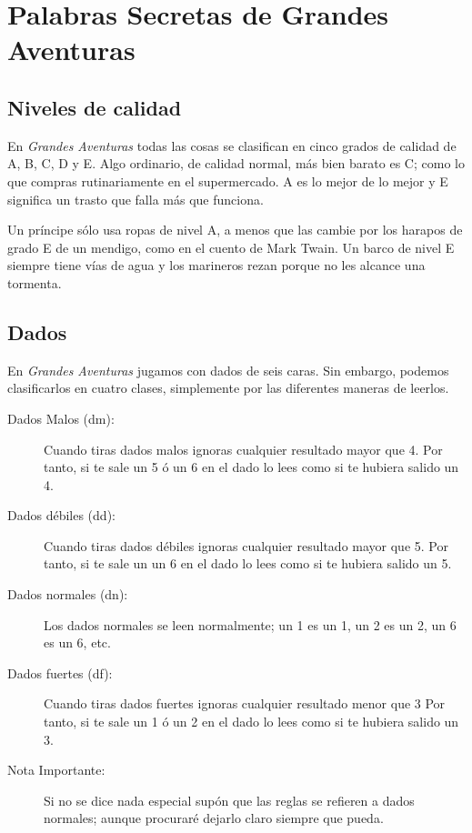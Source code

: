 \chapter{Palabras Secretas de Grandes Aventuras}

\varhrulefill

\section{Niveles de calidad}

En \emph{Grandes Aventuras} todas las cosas se clasifican en cinco grados de calidad de A, B, C, D y E. Algo ordinario, de calidad normal, más bien barato es C; como lo que compras rutinariamente en el supermercado. A es lo mejor de lo mejor y E significa un trasto que falla más que funciona.

Un príncipe sólo usa ropas de nivel A, a menos que las cambie por los harapos de grado E de un mendigo, como en el cuento de Mark Twain. Un barco de nivel E siempre tiene vías de agua y los marineros rezan porque no les alcance una tormenta. 

\section{Dados}

En \emph{Grandes Aventuras} jugamos con dados de seis caras. Sin embargo, podemos clasificarlos en cuatro clases, simplemente por las diferentes maneras de leerlos.

\begin{description}

\item[Dados Malos (dm):]
Cuando tiras dados malos ignoras cualquier resultado mayor que 4. Por tanto, si te sale un 5 ó un 6 en el dado lo lees como si te hubiera salido un 4.

\item[Dados débiles (dd):]
Cuando tiras dados débiles ignoras cualquier resultado mayor que 5. Por tanto, si te sale un un 6 en el dado lo lees como si te hubiera salido un 5.

\item[Dados normales (dn):]
Los dados normales se leen normalmente; un 1 es un 1, un 2 es un 2, un 6 es un 6, etc. 

\item[Dados fuertes (df):] 
Cuando tiras dados fuertes ignoras cualquier resultado menor que 3 Por tanto, si te sale un 1 ó un 2 en el dado lo lees como si te hubiera salido un 3.

\item[Nota Importante: ]
Si no se dice nada especial supón que las reglas se refieren a dados normales; aunque procuraré dejarlo claro siempre que pueda.

\end{description}


